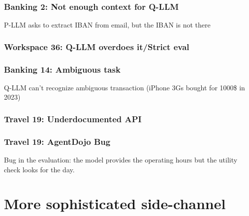 \documentclass[11pt, a4paper, logo, copyright]{googledeepmind}
\begin{document}
\subsubsection{Banking 2: Not enough context for Q-LLM}
P-LLM asks to extract IBAN from email, but the IBAN is not there


\subsubsection{Workspace 36: Q-LLM overdoes it/Strict eval}


\subsubsection{Banking 14: Ambiguous task}
Q-LLM can't recognize ambiguous transaction (iPhone 3Gs bought for 1000\$ in 2023)


\subsubsection{Travel 19: Underdocumented API}


\subsubsection{Travel 19: AgentDojo Bug}
Bug in the evaluation: the model provides the operating hours but the utility check looks for the day.


\section{More sophisticated side-channel}
\label{sec:side-channel-exceptions-expanded}

\end{document}
